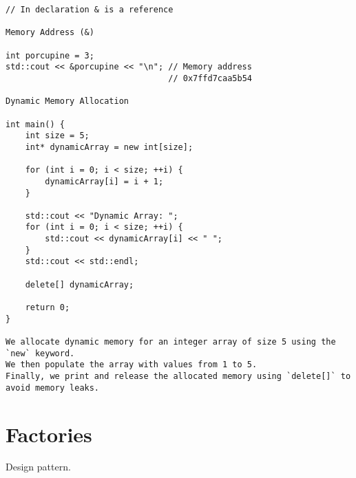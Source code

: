 \documentclass[openany]{report}
\begin{document}
\begin{verbatim}
// In declaration & is a reference

Memory Address (&)

int porcupine = 3;
std::cout << &porcupine << "\n"; // Memory address
                                 // 0x7ffd7caa5b54

Dynamic Memory Allocation

int main() {
    int size = 5;
    int* dynamicArray = new int[size];

    for (int i = 0; i < size; ++i) {
        dynamicArray[i] = i + 1;
    }

    std::cout << "Dynamic Array: ";
    for (int i = 0; i < size; ++i) {
        std::cout << dynamicArray[i] << " ";
    }
    std::cout << std::endl;

    delete[] dynamicArray;

    return 0;
}

We allocate dynamic memory for an integer array of size 5 using the `new` keyword.
We then populate the array with values from 1 to 5.
Finally, we print and release the allocated memory using `delete[]` to avoid memory leaks.
\end{verbatim}

\section{Factories}

Design pattern.
\end{document}
